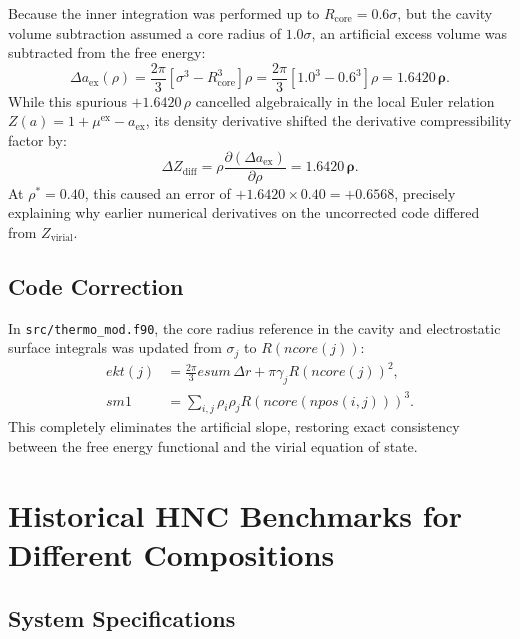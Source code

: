 \documentclass[11pt,a4paper]{article}
\begin{document}
Because the inner integration was performed up to $R_{\text{core}} = 0.6\sigma$, but the cavity volume subtraction assumed a core radius of $1.0\sigma$, an artificial excess volume was subtracted from the free energy:
\begin{equation}
\Delta a_{\text{ex}}(\rho) = \frac{2\pi}{3} \left[ \sigma^3 - R_{\text{core}}^3 \right] \rho = \frac{2\pi}{3} \left[ 1.0^3 - 0.6^3 \right] \rho = \mathbf{1.6420 \, \rho}.
\end{equation}
While this spurious $+1.6420 \, \rho$ cancelled algebraically in the local Euler relation $Z(a) = 1 + \mu^{\text{ex}} - a_{\text{ex}}$, its density derivative shifted the derivative compressibility factor by:
\begin{equation}
\Delta Z_{\text{diff}} = \rho \frac{\partial (\Delta a_{\text{ex}})}{\partial \rho} = \mathbf{1.6420 \, \rho}.
\end{equation}
At $\rho^* = 0.40$, this caused an error of $+1.6420 \times 0.40 = +0.6568$, precisely explaining why earlier numerical derivatives on the uncorrected code differed from $Z_{\text{virial}}$.

\subsection{Code Correction}

In \texttt{src/thermo\_mod.f90}, the core radius reference in the cavity and electrostatic surface integrals was updated from $\sigma_j$ to $R(ncore(j))$:
\begin{align}
ekt(j) &= \frac{2\pi}{3} esum \, \Delta r + \pi \gamma_j R(ncore(j))^2, \\
sm1 &= \sum_{i,j} \rho_i \rho_j R(ncore(npos(i,j)))^3.
\end{align}
This completely eliminates the artificial slope, restoring exact consistency between the free energy functional and the virial equation of state.


\section{Historical HNC Benchmarks for Different Compositions}

\subsection{System Specifications}
\end{document}
